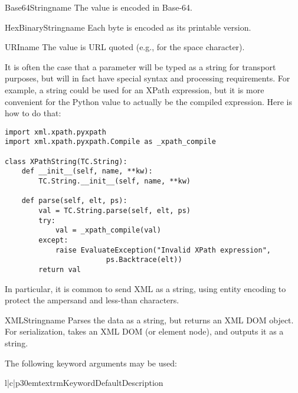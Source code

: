 \begin{classdesc}{Base64String}{name}
The value is encoded in Base-64.
\end{classdesc}

\begin{classdesc}{HexBinaryString}{name}
Each byte is encoded as its printable version.
\end{classdesc}

\begin{classdesc}{URI}{name}
The value is URL quoted (e.g.,  for the space character).
\end{classdesc}

It is often the case that a parameter will be typed as a string for
transport purposes, but will in fact have special syntax and processing
requirements.
For example, a string could be used for an XPath expression, but it is
more convenient for the Python value to
actually be the compiled expression. Here is how to do that:

\begin{verbatim}
import xml.xpath.pyxpath
import xml.xpath.pyxpath.Compile as _xpath_compile

class XPathString(TC.String):
    def __init__(self, name, **kw):
        TC.String.__init__(self, name, **kw)

    def parse(self, elt, ps):
        val = TC.String.parse(self, elt, ps)
        try:
            val = _xpath_compile(val)
        except:
            raise EvaluateException("Invalid XPath expression",
                        ps.Backtrace(elt))
        return val
\end{verbatim}

In particular, it is common to send XML as a string, using entity
encoding to protect the ampersand and less-than characters.

\begin{classdesc}{XMLString}{name}
Parses the data as a string, but returns an XML DOM object.
For serialization, takes an XML DOM (or element node), and outputs
it as a string.

The following keyword arguments may be used:

\begin{tableiii}{l|c|p{30em}}{textrm}{Keyword}{Default}{Description}
\end{tableiii}

\end{classdesc}

